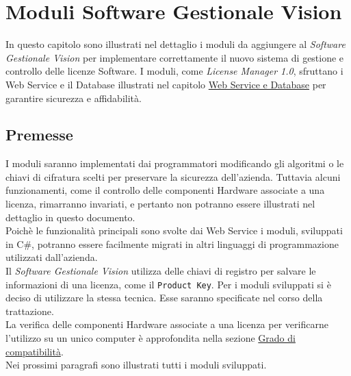 
\chapter{Moduli Software Gestionale Vision}
\label{cap:moduli-vision}
In questo capitolo sono illustrati nel dettaglio i moduli da aggiungere al \textit{Software Gestionale Vision} per implementare correttamente il nuovo sistema di gestione e controllo delle licenze Software. I moduli, come \textit{License Manager 1.0}, sfruttano i Web Service e il Database illustrati nel capitolo {\hyperref[cap:sviluppo-software]{Web Service e Database}} per garantire sicurezza e affidabilità. 


\section{Premesse}
I moduli saranno implementati dai programmatori modificando gli algoritmi o le chiavi di cifratura scelti per preservare la sicurezza dell'azienda. Tuttavia alcuni funzionamenti, come il controllo delle componenti Hardware associate a una licenza, rimarranno invariati, e pertanto non potranno essere illustrati nel dettaglio in questo documento.
\\Poichè le funzionalità principali sono svolte dai Web Service i moduli, sviluppati in C\#, potranno essere facilmente migrati in altri linguaggi di programmazione utilizzati dall'azienda.
\\
Il \textit{Software Gestionale Vision} utilizza delle chiavi di registro per salvare le informazioni di una licenza, come il \texttt{Product Key}. Per i moduli sviluppati si è deciso di utilizzare la stessa tecnica. Esse saranno specificate nel corso della trattazione. 
\\La verifica delle componenti Hardware associate a una licenza per verificarne l'utilizzo su un unico computer è approfondita nella sezione {\hyperref[cap:appA]{Grado di compatibilità}}.  
\\Nei prossimi paragrafi sono illustrati tutti i moduli sviluppati.

\newpage
